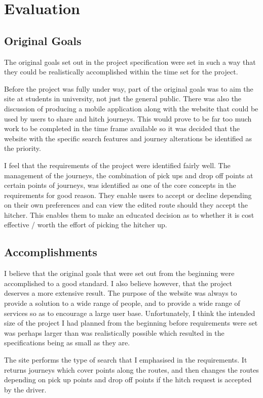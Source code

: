 \chapter{Evaluation}

\section{Original Goals}
The original goals set out in the project specification were set in such a way that they could be realistically accomplished within the time set for the project. 

Before the project was fully under way, part of the original goals was to aim the site at students in university, not just the general public. There was also the discussion of producing a mobile application along with the website that could be used by users to share and hitch journeys. This would prove to be far too much work to be completed in the time frame available so it was decided that the website with the specific search features and journey alterations be identified as the priority.

I feel that the requirements of the project were identified fairly well. The management of the journeys, the combination of pick ups and drop off points at certain points of journeys, was identified as one of the core concepts in the requirements for good reason. They enable users to accept or decline depending on their own preferences and can view the edited route should they accept the hitcher. This enables them to make an educated decision as to whether it is cost effective / worth the effort of picking the hitcher up.

\section{Accomplishments}
I believe that the original goals that were set out from the beginning were accomplished to a good standard. I also believe however, that the project deserves a more extensive result. The purpose of the website was always to provide a solution to a wide range of people, and to provide a wide range of services so as to encourage a large user base. Unfortunately, I think the intended size of the project I had planned from the beginning before requirements were set was perhaps larger than was realistically possible which resulted in the specifications being as small as they are. 

The site performs the type of search that I emphasised in the requirements. It returns journeys which cover points along the routes, and then changes the routes depending on pick up points and drop off points if the hitch request is accepted by the driver. 


